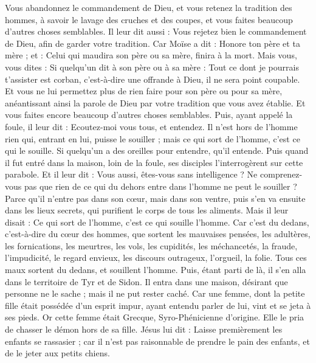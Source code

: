 \begin{multicols}{2}
Vous abandonnez le commandement de Dieu, et vous retenez la tradition des hommes, à savoir le lavage des cruches et des coupes, et vous faites beaucoup d'autres choses semblables.
Il leur dit aussi : Vous rejetez bien le commandement de Dieu, afin de garder votre tradition.
Car Moïse a dit : Honore ton père et ta mère ; et : Celui qui maudira son père ou sa mère, finira à la mort.
Mais vous, vous dites : Si quelqu'un dit à son père ou à sa mère : Tout ce dont je pourrais t’assister est corban, c’est-à-dire une offrande à Dieu, il ne sera point coupable.
Et vous ne lui permettez plus de rien faire pour son père ou pour sa mère,
anéantissant ainsi la parole de Dieu par votre tradition que vous avez établie. Et vous faites encore beaucoup d’autres choses semblables.
Puis, ayant appelé la foule, il leur dit : Ecoutez-moi vous tous, et entendez.
Il n’est hors de l’homme rien qui, entrant en lui, puisse le souiller ; mais ce qui sort de l’homme, c’est ce qui le souille.
Si quelqu'un a des oreilles pour entendre, qu'il entende.
Puis quand il fut entré dans la maison, loin de la foule, ses disciples l'interrogèrent sur cette parabole.
Et il leur dit : Vous aussi, êtes-vous sans intelligence ? Ne comprenez-vous pas que rien de ce qui du dehors entre dans l’homme ne peut le souiller ?
Parce qu'il n'entre pas dans son cœur, mais dans son ventre, puis s’en va ensuite dans les lieux secrets, qui purifient le corps de tous les aliments.
Mais il leur disait : Ce qui sort de l'homme, c'est ce qui souille l'homme.
Car c’est du dedans, c'est-à-dire du cœur des hommes, que sortent les mauvaises pensées, les adultères, les fornications, les meurtres,
les vols, les cupidités, les méchancetés, la fraude, l'impudicité, le regard envieux, les discours outrageux, l’orgueil, la folie.
Tous ces maux sortent du dedans, et souillent l'homme.
Puis, étant parti de là, il s'en alla dans le territoire de Tyr et de Sidon. Il entra dans une maison, désirant que personne ne le sache ; mais il ne put rester caché.
Car une femme, dont la petite fille était possédée d'un esprit impur, ayant entendu parler de lui, vint et se jeta à ses pieds.
Or cette femme était Grecque, Syro-Phénicienne d’origine. Elle le pria de chasser le démon hors de sa fille. Jésus lui dit :
Laisse premièrement les enfants se rassasier ; car il n'est pas raisonnable de prendre le pain des enfants, et de le jeter aux petits chiens.

\end{multicols}
